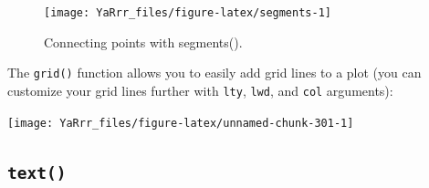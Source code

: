 \documentclass[]{book}
\newenvironment{Shaded}{\begin{snugshade}}{\end{snugshade}}
\newcommand{\KeywordTok}[1]{\textcolor[rgb]{0.13,0.29,0.53}{\textbf{#1}}}
\newcommand{\DataTypeTok}[1]{\textcolor[rgb]{0.13,0.29,0.53}{#1}}
\newcommand{\DecValTok}[1]{\textcolor[rgb]{0.00,0.00,0.81}{#1}}
\newcommand{\StringTok}[1]{\textcolor[rgb]{0.31,0.60,0.02}{#1}}
\newcommand{\CommentTok}[1]{\textcolor[rgb]{0.56,0.35,0.01}{\textit{#1}}}
\newcommand{\OperatorTok}[1]{\textcolor[rgb]{0.81,0.36,0.00}{\textbf{#1}}}
\newcommand{\NormalTok}[1]{#1}
\theoremstyle{definition}
\theoremstyle{definition}
\theoremstyle{remark}
\begin{document}
\begin{figure}

{\centering \texttt{[image: YaRrr\_files/figure-latex/segments-1]} 

}

\caption{Connecting points with segments().}\label{fig:segments}
\end{figure}

The \texttt{grid()} function allows you to easily add grid lines to a
plot (you can customize your grid lines further with \texttt{lty},
\texttt{lwd}, and \texttt{col} arguments):

\begin{Shaded}
\end{Shaded}

\begin{center}\texttt{[image: YaRrr\_files/figure-latex/unnamed-chunk-301-1]} \end{center}

\subsection{\texorpdfstring{\texttt{text()}}{text()}}\label{text}
\end{document}
